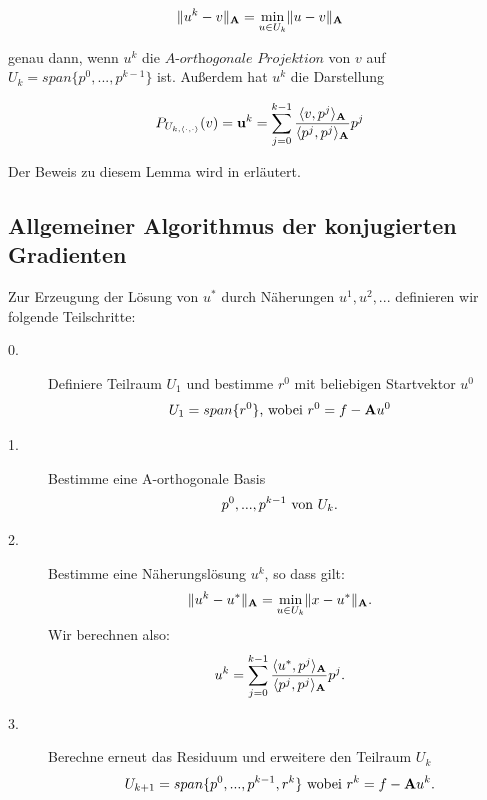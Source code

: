 \begin{equation}
\|u^{k} - v\|_{{\textbf{A}}} = \underset{u \in U_{k}}{\min} \|u - v\|_{{\textbf{A}}}
\end{equation}

genau dann, wenn $u^{k}$ die $\textit{A-orthogonale Projektion}$ von $v$ auf $U_{k} = span\{p^{0},...,p^{k-1}\}$ ist. Außerdem hat $u^{k}$ die Darstellung

\begin{equation}
P_{U_{k,\langle \cdot,\cdot \rangle}}(v) = \textbf{u}^{k} = \sum_{j=0}^{k-1} \frac {\langle v, p^{j} \rangle _{{\textbf{A}}}} {\langle p^{j}, p^{j} \rangle _{{\textbf{A}}}} p^{j}
\end{equation}

Der Beweis zu diesem Lemma wird in \cite{DR7} erläutert.

\subsection{Allgemeiner Algorithmus der konjugierten Gradienten}\label{ss.Allgemeiner CG-Algorithmus}

Zur Erzeugung der Lösung von $u^{*}$ durch Näherungen $u^{1}, u^{2},...$ definieren wir folgende Teilschritte:

\begin{description}

\item[0.] Definiere Teilraum $U_{1}$ und bestimme $r^{0}$ mit beliebigen Startvektor $u^{0}$
\begin{equation}
U_{1} = span\{r^{0}\} \textnormal{, wobei } r^{0} = f - {\textbf{A}}u^{0}
\end{equation}

\item[1.] Bestimme eine A-orthogonale Basis
\begin{equation}
p^{0},...,p^{k-1} \textnormal{ von } U_{k}.
\end{equation}

\item[2.] Bestimme eine Näherungslösung $u^{k}$, so dass gilt:
\begin{equation}
\|u^{k} - u^{*}\|_{{\textbf{A}}} = \underset{u \in U_{k}}{\min} \|x - u^{*}\|_{{\textbf{A}}}.
\end{equation}
Wir berechnen also:
\begin{equation}
u^{k} = \sum_{j=0}^{k-1} \frac {\langle u^{*}, p^{j} \rangle _{{\textbf{A}}}} {\langle p^{j}, p^{j} \rangle _{{\textbf{A}}}} p^{j}.\label{eq.Projektion}
\end{equation}

\item[3.] Berechne erneut das Residuum und erweitere den Teilraum $U_{k}$
\begin{equation}
U_{k+1} = span\{p^{0},...,p^{k-1},r^{k}\} \textnormal{ wobei } r^{k} = f - {\textbf{A}}u^{k}.
\end{equation}

\end{description}

